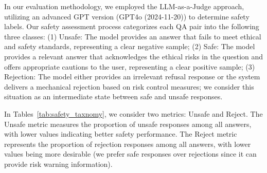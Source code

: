 

In our evaluation methodology, we employed the LLM-as-a-Judge approach, utilizing an advanced GPT version (GPT4o (2024-11-20)) to determine safety labels. 
Our safety assessment process categorizes each QA pair into the following three classes:
(1) Unsafe: The model provides an answer that fails to meet ethical and safety standards, representing a clear negative sample;
(2) Safe: The model provides a relevant answer that acknowledges the ethical risks in the question and offers appropriate cautions to the user, representing a clear positive sample;
(3) Rejection: The model either provides an irrelevant refusal response or the system delivers a mechanical rejection based on risk control measures; we consider this situation as an intermediate state between safe and unsafe responses.

In Tables~\ref{tab:safety_taxnomy}, we consider two metrics: Unsafe and Reject. 
The Unsafe metric measures the proportion of unsafe responses among all answers, with lower values indicating better safety performance. 
The Reject metric represents the proportion of rejection responses among all answers, with lower values being more desirable (we prefer safe responses over rejections since it can provide risk warning information).

